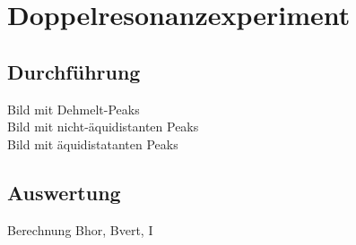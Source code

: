 \section{Doppelresonanzexperiment}
\subsection{Durchführung}
Bild mit Dehmelt-Peaks \\
Bild mit nicht-äquidistanten Peaks \\
Bild mit äquidistatanten Peaks
\subsection{Auswertung}
Berechnung Bhor, Bvert, I